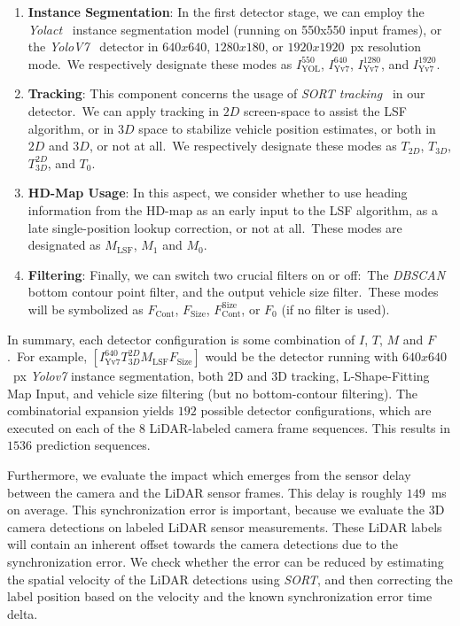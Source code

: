 \begin{enumerate}
    \item \textbf{Instance Segmentation}: In the first detector stage, we can employ the \textit{Yolact}~\cite{liu2021yolactedge} instance segmentation model (running on 550x550 input frames), or the \textit{YoloV7}~\cite{wang2022yolov7} detector in $640x640$, $1280x180$, or $1920x1920$~px resolution mode.\ We respectively designate these modes as $I^{550}_\text{YOL}$, $I^{640}_\text{Yv7}$, $I^{1280}_\text{Yv7}$, and $I^{1920}_\text{Yv7}$.
    \item \textbf{Tracking}: This component concerns the usage of \textit{SORT tracking}~\cite{bewley2016simple} in our detector.\ We can apply tracking in $2D$ screen-space to assist the LSF algorithm, or in $3D$ space to stabilize vehicle position estimates, or both in $2D$ and $3D$, or not at all.\ We respectively designate these modes as $T_{2D}$, $T_{3D}$, $T^{2D}_{3D}$, and $T_0$.
    \item \textbf{HD-Map Usage}: In this aspect, we consider whether to use heading information from the HD-map as an early input to the LSF algorithm, as a late single-position lookup correction, or not at all.\ These modes are designated as $M_\text{LSF}$, $M_1$ and $M_0$.
    \item \textbf{Filtering}: Finally, we can switch two crucial filters on or off:\ The \textit{DBSCAN}~\cite{schubert2017dbscan} bottom contour point filter, and the output vehicle size filter.\ These modes will be symbolized as $F_\text{Cont}$, $F_\text{Size}$, $F_\text{Cont}^\text{Size}$, or $F_0$ (if no filter is used).
\end{enumerate}

In summary, each detector configuration is some combination of $I$, $T$, $M$ and $F$.\ For example, $\left[I^{640}_\text{Yv7}T^{2D}_{3D}M_\text{LSF}F_\text{Size}\right]$ would be the detector running with $640x640$~px \textit{Yolov7} instance segmentation, both 2D and 3D tracking, L-Shape-Fitting Map Input, and vehicle size filtering (but no bottom-contour filtering).
The combinatorial expansion yields $192$ possible detector configurations, which are executed on each of the $8$ LiDAR-labeled camera frame sequences.
This results in $1536$ prediction sequences.

Furthermore, we evaluate the impact which emerges from the sensor delay between the camera and the LiDAR sensor frames.
This delay is roughly $149$~ms on average.
This synchronization error is important, because we evaluate the 3D camera detections on labeled LiDAR sensor measurements.
These LiDAR labels will contain an inherent offset towards the camera detections due to the synchronization error.
We check whether the error can be reduced by estimating the spatial velocity of the LiDAR detections using \textit{SORT}, and then correcting the label position based on the velocity and the known synchronization error time delta.

